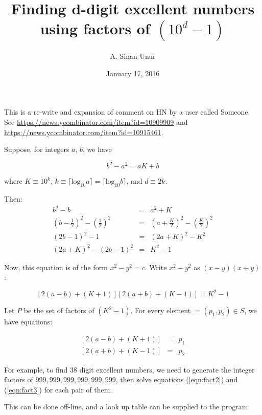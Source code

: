 \documentclass[12pt,letterpaper]{article}
\begin{document}
\title{Finding d-digit excellent numbers using factors of $(10^d - 1)$}

\author{A. Sinan Unur}

\date{January 17, 2016}

\maketitle

This is a re-write and expansion of comment on HN by a user called Someone. See \url{https://news.ycombinator.com/item?id=10909909} and \url{https://news.ycombinator.com/item?id=10915461}.

Suppose, for integers $a$, $b$, we have

\[ b^2 - a^2 = aK + b \]

where $K\equiv 10^{k}$, $k\equiv\lceil\mathrm{log}_{10}a\rceil=\lceil\mathrm{log}_{10}b\rceil$, and $d\equiv 2k$.

Then:
%
\begin{eqnarray}
%
b^2 - b & = & a^2 + K \\
%
(b - \frac{1}{2})^2 - (\frac{1}{2})^2 & = & (a + \frac{K}{2})^2 - (\frac{K}{2})^2 \\
%
(2b - 1)^2 - 1 & = & (2a + K)^2 - K^2 \\
%
(2a + K)^2 - (2b - 1)^2 & = & K^2 - 1
%
\end{eqnarray}

Now, this equation is of the form $x^2 - y^2 = c$. Write $x^2 - y^2$ as $(x - y)(x + y)$:

\begin{equation}
%
\left[2(a - b) + (K + 1)\right] \left[2(a + b) + (K - 1)\right] = K^2 - 1 \label{eqn:fact1}
%
\end{equation}

Let $P$ be the set of factors of $(K^2 - 1)$. For every element $ = (p_1,p_2)\in S$, we have equations:

\begin{eqnarray}
%
\left[2(a - b) + (K + 1)\right] & = & p_1 \label{eqn:fact2}\\
%
\left[2(a + b) + (K - 1)\right] & = & p_2 \label{eqn:fact3}
%
\end{eqnarray}

For example, to find 38 digit excellent numbers, we need to generate the integer factors of $999,999,999,999,999,999$, then solve equations (\ref{eqn:fact2}) and (\ref{eqn:fact3}) for each pair of them.

This can be done off-line, and a look up table can be supplied to the program.
\end{document}
